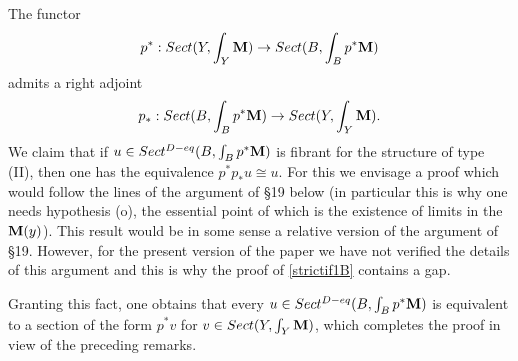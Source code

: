 The functor
$$
p^{\ast}: Sect (Y, \int _Y{\bf M} )\rightarrow Sect (B, \int _Bp^{\ast}{\bf M} )
$$
admits a right adjoint
$$
p_{\ast}: Sect (B, \int _Bp^{\ast}{\bf M} )
\rightarrow  Sect (Y, \int _Y{\bf M} ).
$$
We claim that if $u\in Sect ^{D-eq}(B, \int _Bp^{\ast}{\bf M} )$
is fibrant for the structure of type (II),
then one has the equivalence
$p^{\ast}p_{\ast} u\cong u$. For this we envisage a proof which would
follow the lines of the argument of \S 19 below (in particular this is
why one needs hypothesis (o), the essential point of which is the existence
of limits in the ${\bf M} (y)$). This result would be in some sense a
relative version of the argument of \S 19. However, for the present version
of the paper
we have not verified the details of this argument and
this is why the
proof of \ref{strictif1B} contains a gap.

Granting this fact, one obtains that every
$u\in Sect ^{D-eq}(B, \int _Bp^{\ast}{\bf M} )$ is equivalent to
a section of the form $p^{\ast} v$ for
$v\in Sect (Y, \int _Y{\bf M} )$, which completes the proof in view of the
preceding remarks.
\eop






